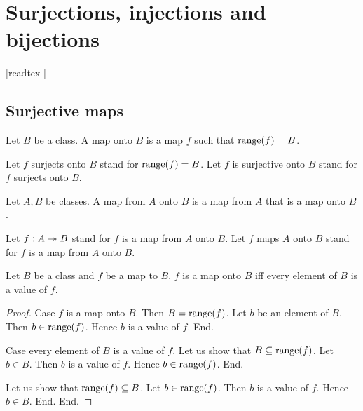 \documentclass[../../set-theory/set-theory.tex]{subfiles}
\begin{document}
  \chapter{Surjections, injections and bijections}\label{injections-surjections-bijections}


  \begin{forthel}

    [readtex ]

  \end{forthel}


  \section{Surjective maps}

  \begin{forthel}
    \begin{definition}
      Let $B$ be a class.
      A map onto $B$ is a map $f$ such that $\operatorname{range}(f) = B$.
    \end{definition}

    Let $f$ surjects onto $B$ stand for $\operatorname{range}(f) = B$.
    Let $f$ is surjective onto $B$ stand for $f$ surjects onto $B$.
  \end{forthel}

  \begin{forthel}
    \begin{definition}
      Let $A, B$ be classes.
      A map from $A$ onto $B$ is a map from $A$ that is a map onto $B$.
    \end{definition}

    Let $f: A \twoheadrightarrow B$ stand for $f$ is a map from $A$ onto $B$.
    Let $f$ maps $A$ onto $B$ stand for $f$ is a map from $A$ onto $B$.
  \end{forthel}

  \begin{forthel}
    \begin{proposition}
      Let $B$ be a class and $f$ be a map to $B$.
      $f$ is a map onto $B$ iff every element of $B$ is a value of $f$.
    \end{proposition}
    \begin{proof}
      Case $f$ is a map onto $B$.
        Then $B = \operatorname{range}(f)$.
        Let $b$ be an element of $B$.
        Then $b \in \operatorname{range}(f)$.
        Hence $b$ is a value of $f$.
      End.

      Case every element of $B$ is a value of $f$.
        Let us show that $B \subseteq \operatorname{range}(f)$.
          Let $b \in B$.
          Then $b$ is a value of $f$.
          Hence $b \in \operatorname{range}(f)$.
        End.

        Let us show that $\operatorname{range}(f) \subseteq B$.
          Let $b \in \operatorname{range}(f)$.
          Then $b$ is a value of $f$.
          Hence $b \in B$.
        End.
      End.
    \end{proof}
  \end{forthel}
\end{document}
